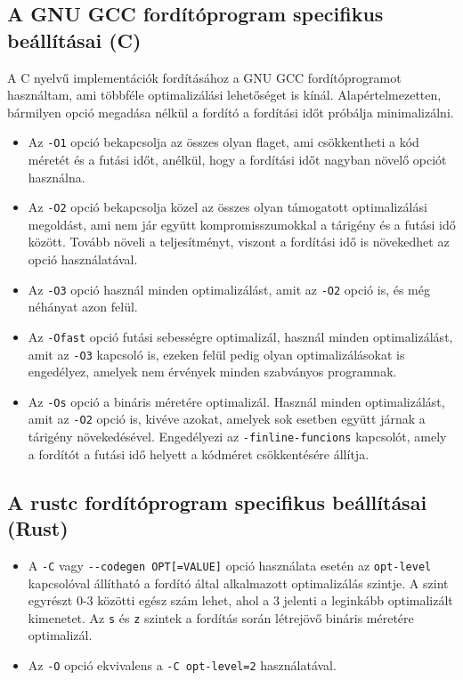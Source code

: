 \subsection{A GNU GCC fordítóprogram specifikus beállításai (C)}
A C nyelvű implementációk fordításához a GNU GCC fordítóprogramot használtam, ami többféle optimalizálási lehetőséget is kínál. Alapértelmezetten, bármilyen opció megadása nélkül a fordító a fordítási időt próbálja minimalizálni.
\begin{itemize}
  \item Az \lstinline{-O1} opció bekapcsolja az összes olyan flaget, ami csökkentheti a kód méretét és a futási időt, anélkül, hogy a fordítási időt nagyban növelő opciót használna.
  \item Az \lstinline{-O2} opció bekapcsolja közel az összes olyan támogatott optimalizálási megoldást, ami nem jár együtt kompromisszumokkal a tárigény és a futási idő között. Tovább növeli a teljesítményt, viszont a fordítási idő is növekedhet az opció használatával.
  \item Az \lstinline{-O3} opció használ minden optimalizálást, amit az \lstinline{-O2} opció is, és még néhányat azon felül.
  \item Az \lstinline{-Ofast} opció futási sebességre optimalizál, használ minden optimalizálást, amit az \lstinline{-O3} kapcsoló is, ezeken felül pedig olyan optimalizálásokat is engedélyez, amelyek nem érvények minden szabványos programnak.
  \item Az \lstinline{-Os} opció a bináris méretére optimalizál. Használ minden optimalizálást, amit az \lstinline{-O2} opció is, kivéve azokat, amelyek sok esetben együtt járnak a tárigény növekedésével. Engedélyezi az \lstinline{-finline-funcions} kapcsolót, amely a fordítót a futási idő helyett a kódméret csökkentésére állítja. 
\end{itemize}
\subsection{A rustc fordítóprogram specifikus beállításai (Rust)}
\begin{itemize}
  \item A \lstinline{-C} vagy \lstinline{--codegen OPT[=VALUE]} opció használata esetén az \lstinline{opt-level} kapcsolóval állítható a fordító által alkalmazott optimalizálás szintje. A szint egyrészt 0-3 közötti egész szám lehet, ahol a 3 jelenti a leginkább optimalizált kimenetet. Az \lstinline{s} és \lstinline{z} szintek a fordítás során létrejövő bináris méretére optimalizál.
  \item Az \lstinline{-O} opció ekvivalens a \lstinline{-C opt-level=2} használatával.
\end{itemize}
